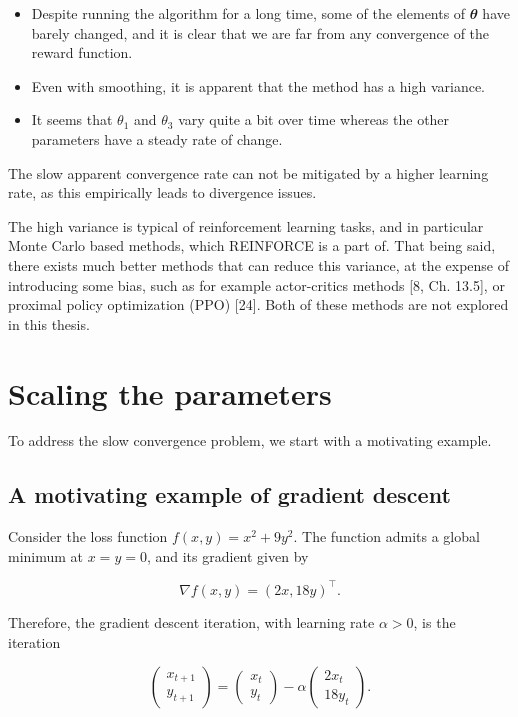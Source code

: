 \documentclass[
  letterpaper,
]{report}
\providecommand{\tightlist}{%
  \setlength{\itemsep}{0pt}\setlength{\parskip}{0pt}}\usepackage{longtable,booktabs,array}
\theoremstyle{definition}
\theoremstyle{plain}
\theoremstyle{definition}
\theoremstyle{remark}
\begin{document}
\begin{itemize}
\tightlist
\item
  Despite running the algorithm for a long time, some of the elements of
  \(\mathbfit{\theta}\) have barely changed, and it is clear that we are
  far from any convergence of the reward function.
\item
  Even with smoothing, it is apparent that the method has a high
  variance.
\item
  It seems that \(\theta_1\) and \(\theta_3\) vary quite a bit over time
  whereas the other parameters have a steady rate of change.
\end{itemize}

The slow apparent convergence rate can not be mitigated by a higher
learning rate, as this empirically leads to divergence issues.

The high variance is typical of reinforcement learning tasks, and in
particular Monte Carlo based methods, which REINFORCE is a part of. That
being said, there exists much better methods that can reduce this
variance, at the expense of introducing some bias, such as for example
actor-critics methods {[}8, Ch. 13.5{]}, or proximal policy optimization
(PPO) {[}24{]}. Both of these methods are not explored in this thesis.

\section{Scaling the parameters}\label{scaling-the-parameters}

To address the slow convergence problem, we start with a motivating
example.

\subsection{A motivating example of gradient
descent}\label{a-motivating-example-of-gradient-descent}

Consider the loss function \(f(x,y) = x^2 + 9y^2\). The function admits
a global minimum at \(x = y = 0\), and its gradient given by

\[
\nabla f(x,y) = (2x,18y)^\intercal.
\]

Therefore, the gradient descent iteration, with learning rate
\(\alpha>0\), is the iteration

\[
\begin{pmatrix}
x_{t+1}\\
y_{t+1}
\end{pmatrix} = \begin{pmatrix}
x_t\\
y_t
\end{pmatrix} - \alpha \begin{pmatrix}
2x_t\\
18y_t
\end{pmatrix}.
\]
\end{document}
